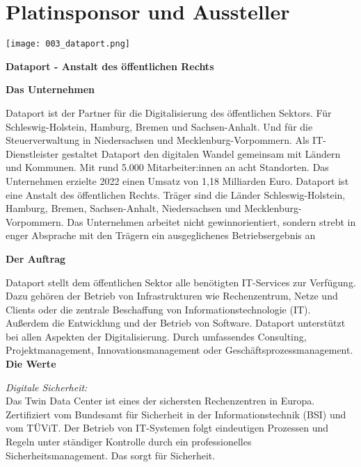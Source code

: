 \cleardoubleevenpage
\section*{Platinsponsor und Aussteller}
  \texttt{[image: 003\_dataport.png]}
  \vspace{1.0\baselineskip}
  
\noindent
    {\bfseries Dataport - Anstalt des öffentlichen Rechts}
    \vspace{1.0\baselineskip}
    
\noindent
    {\bfseries Das Unternehmen}
    
\noindent    
Dataport ist der Partner für die Digitalisierung des öffentlichen Sektors. Für Schleswig-Holstein, Hamburg, Bremen und Sachsen-Anhalt. Und für die Steuerverwaltung in Niedersachsen und Meck\-lenburg-Vorpommern. Als IT-Dienstleister gestaltet Dataport den digitalen Wandel gemeinsam mit Ländern und Kommunen. Mit rund 5.000 Mitarbeiter:innen an acht Standorten. Das Unternehmen erzielte 2022 einen Umsatz von 1,18 Milliarden Euro.    
Dataport ist eine Anstalt des öffentlichen Rechts. Träger sind die Länder Schleswig-Holstein, Hamburg, Bremen, Sachsen-Anhalt, Niedersachsen und Meck\-lenburg-Vorpommern. Das Unternehmen arbeitet nicht gewinnorientiert, sondern strebt in enger Absprache mit den Trägern ein ausgeglichenes Betriebsergebnis an
\vspace{1.0\baselineskip}

\noindent
{\bfseries Der Auftrag}

\noindent
Dataport stellt dem öffentlichen Sektor alle benötigten IT-Services zur Verfügung. Dazu gehören der Betrieb von Infrastrukturen wie Rechenzentrum, Netze und Clients oder die zentrale Beschaffung von Informationstechnologie (IT). Außerdem die Entwicklung und der Betrieb von Software. Dataport unterstützt bei allen Aspekten der Digitalisierung. Durch umfassendes Consulting, Projektmanagement, Innovationsmanagement oder Geschäftsprozessmanagement.
\newpage
\noindent
{\bfseries Die Werte}
\vspace{1.0\baselineskip}

\noindent
{\em Digitale Sicherheit:}\\
Das Twin Data Center ist eines der sichersten Rechenzentren in Europa. Zertifiziert vom Bundesamt für Sicherheit in der Informationstechnik (BSI) und vom TÜViT. Der Betrieb von IT-Systemen folgt eindeutigen Prozessen und Regeln unter ständiger Kontrolle durch ein professionelles Sicherheitsmanagement. Das sorgt für Sicherheit.
\vspace{1.0\baselineskip}

